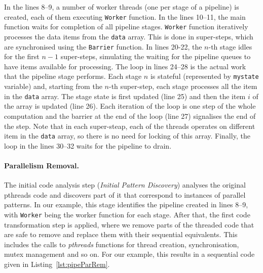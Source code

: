 \noindent
In the lines 8--9, a number of worker threads (one per stage of a pipeline) is created, each of them executing \lstinline{Worker} function. In the lines 10--11, the main function waits for completion of all pipeline stages. \lstinline{Worker} function iteratively processes the data items from the \lstinline{data} array. This is done in super-steps, which are synchronised using the \lstinline{Barrier} function. In lines 20-22, the $n$-th stage idles for the first $n-1$ super-steps, simulating the waiting for the pipeline queues to have items available for processing. The loop in lines 24--28 is the actual work that the pipeline stage performs. Each stage $n$ is stateful (represented by \lstinline{mystate} variable) and, starting from the $n$-th super-step, each stage processes all the item in the \lstinline{data} array. The stage state is first updated (line 25) and then the item $i$ of the array is updated (line 26). Each iteration of the loop is one step of the whole computation and the barrier at the end of the loop (line 27) signalises the end of the step. Note that in each super-steap, each of the threads operates on different item in the \lstinline{data} array, so there is no need for locking of this array. Finally, the loop in the lines 30--32 waits for the pipeline to drain. 

\paragraph{Parallelism Removal.}
The initial code analysis step (\emph{Initial Pattern Discovery}) analyses the original pthreads code and discovers part of it that correspond to instances of parallel patterns. In our example, this stage identifies the pipeline created in lines 8--9, with \lstinline{Worker} being the worker function for each stage. After that, the first code transformation step is applied, where we remove parts of the threaded code that are safe to remove and replace them with their sequential equivalents. This includes the calls to \emph{pthreads} functions for thread creation, synchronisation, mutex management and so on. For our example, this results in a sequential code given in Listing~\ref{lst:pipeParRem}.

